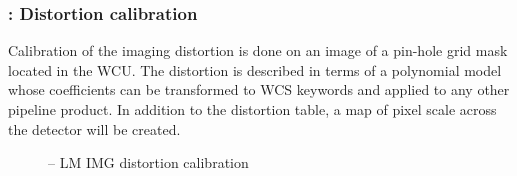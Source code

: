 \clearpage
\subsubsection{:  Distortion calibration}
\label{rec:metis_lm_img_distortion}
\label{lm_img_distortion}
\label{rec:lm_img_distortion}
\label{sssec:lm_img_distortion}

Calibration of the imaging distortion is done on an image of a
pin-hole grid mask located in the \ac{WCU}. The
distortion is described in terms of a polynomial model whose
coefficients can be transformed to WCS keywords and applied to any
other pipeline product. In addition to the distortion table, a map of
pixel scale across the detector will be created.




\begin{figure}[hb]
    \centering
    \def \globalscale {0.700000}
    \fontsize{10}{12}\selectfont
    
    \caption[Recipe: ]{%
     -- LM IMG distortion calibration}
  \label{fig:metis_lm_img_distortion}
\end{figure}
\restoregeometry

\FloatBarrier

